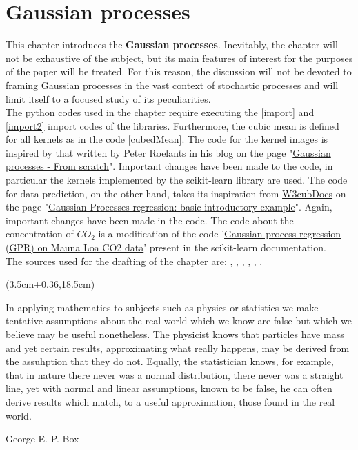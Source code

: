 \chapter{Gaussian processes}\label{gaussianProcessChapter}
This chapter introduces the \textbf{Gaussian processes}. Inevitably, the chapter will not be exhaustive of the subject, but its main features of interest for the purposes of the paper will be treated. For this reason, the discussion will not be devoted to framing Gaussian processes in the vast context of stochastic processes and will limit itself to a focused study of its peculiarities.\\
The python codes used in the chapter require executing the \ref{import} and \ref{import2} import codes of the libraries. Furthermore, the cubic mean is defined for all kernels as in the code \ref{cubedMean}. 
The code for the kernel images is inspired by that written by Peter Roelants in his blog on the page "\href{https://peterroelants.github.io/posts/gaussian-process-tutorial/#Gaussian-processes-(1/3)---From-scratch}{Gaussian processes - From scratch}". Important changes have been made to the code, in particular the kernels implemented by the scikit-learn library are used.
The code for data prediction, on the other hand, takes its inspiration from \href{https://docs.w3cub.com/about/}{W3cubDocs} on the page "\href{https://docs.w3cub.com/scikit_learn/auto_examples/gaussian_process/plot_gpr_noisy_targets}{Gaussian Processes regression: basic introductory example}". Again, important changes have been made in the code.
The code about the concentration of $CO_2$ is a modification of the code '\href{https://scikit-learn.org/stable/auto_examples/gaussian_process/plot_gpr_co2.html}{Gaussian process regression (GPR) on Mauna Loa CO2 data}' present in the scikit-learn documentation.\\
The sources used for the drafting of the chapter are: \cite{rasmussen_gaussian_2006}, \cite{murphy_probabilistic_2022}, \cite{rasmussen_gaussian_2004}, \cite{duvenaud_automatic_2014}, \cite{gortler_visual_2019}, \cite{murphy_machine_2012}.


\begin{textblock*}{0.64\textwidth}(3.5cm+0.36\textwidth,18.5cm)
\epigraph{In applying mathematics to subjects such as physics
or statistics we make tentative assumptions about the
real world which we know are false but which we believe
may be useful nonetheless. The physicist knows that
particles have mass and yet certain results, approximating
what really happens, may be derived from the assuhption that they do not. Equally, the statistician knows, for
example, that in nature there never was a normal distribution, there never was a straight line, yet with normal and
linear assumptions, known to be false, he can often derive
results which match, to a useful approximation, those
found in the real world.}{George E. P. Box}
\end{textblock*}

